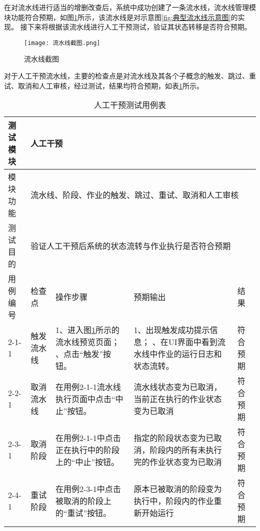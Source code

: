 在对流水线进行适当的增删改查后，系统中成功创建了一条流水线，流水线管理模块功能符合预期，如图\ref{fig:流水线截图}所示，该流水线是对示意图\ref{fig:典型流水线示意图}的实现。
接下来将根据该流水线进行人工干预测试，验证其状态转移是否符合预期。

\begin{figure}[h]
  \centering
  \texttt{[image: 流水线截图.png]}
  \caption{流水线截图}
  \label{fig:流水线截图}
\end{figure}

对于人工干预流水线，主要的检查点是对流水线及其各个子概念的触发、跳过、重试、取消和人工审核，经过测试，结果均符合预期，如表\ref{tab:人工干预测试用例表}所示。

\begin{table}[ht]
  \centering
  \caption{人工干预测试用例表}
  \label{tab:人工干预测试用例表}
  \begin{tabular}{|p{1.5cm}|p{2.5cm}|p{3cm}|p{3cm}|p{1.5cm}|}
  \hline
  \multicolumn{1}{|p{1.5cm}|}{测试模块} & \multicolumn{4}{l|}{人工干预} \\ \hline
  \multicolumn{1}{|p{1.5cm}|}{模块功能} & \multicolumn{4}{l|}{流水线、阶段、作业的触发、跳过、重试、取消和人工审核} \\ \hline
  \multicolumn{1}{|p{1.5cm}|}{测试目的} & \multicolumn{4}{l|}{验证人工干预后系统的状态流转与作业执行是否符合预期} \\ \hline
  用例编号 & 检查点 & 操作步骤 & 预期输出 & 结果 \\ \hline
  2-1-1 & 触发流水线 & 1、进入图\ref{fig:流水线截图}所示的流水线预览页面； \newline 2、点击“触发”按钮。& 1、出现触发成功提示信息； \newline 2、在UI界面中看到流水线中作业的运行日志和状态流转。 & 符合预期 \\ \hline
  2-2-1 & 取消流水线 & 在用例2-1-1流水线执行页面中点击“中止”按钮。 & 流水线状态变为已取消，当前正在执行的作业状态变为已取消 & 符合预期 \\ \hline
  2-3-1 & 取消阶段 & 在用例2-1-1中点击正在执行中的阶段上的“中止”按钮。 & 指定的阶段状态变为已取消，阶段内的所有未执行完的作业状态变为已取消 & 符合预期 \\ \hline
  2-4-1 & 重试阶段 & 在用例2-3-1中点击被取消的阶段上的“重试”按钮。 & 原本已被取消的阶段变为执行中，阶段内的作业重新开始运行 & 符合预期 \\ \hline


\end{tabular}
\end{table}
